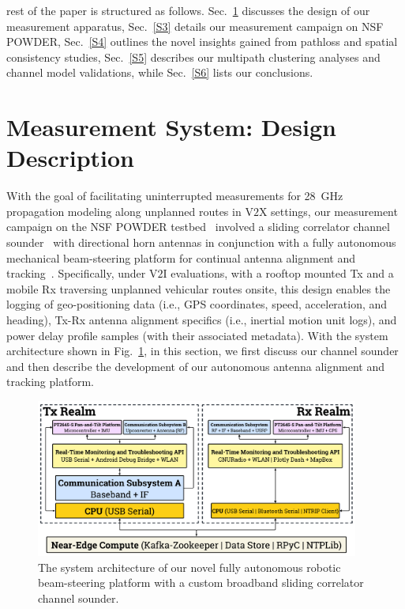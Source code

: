 \documentclass[10pt, twocolumn]{IEEEtran}
\begin{document}
 rest of the paper is structured as follows. Sec.~\ref{S2} discusses the design of our measurement apparatus, Sec.~\ref{S3} details our measurement campaign on NSF POWDER, Sec.~\ref{S4} outlines the novel insights gained from pathloss and spatial consistency studies, Sec.~\ref{S5} describes our multipath clustering analyses and channel model validations, while Sec.~\ref{S6} lists our conclusions.
\vspace{-8mm}

\section{Measurement System: Design Description}\label{S2}
With the goal of facilitating uninterrupted measurements for \SI{28}{\giga\hertz} propagation modeling along unplanned routes in V$2$X settings, our measurement campaign on the NSF POWDER testbed~\cite{POWDER} involved a sliding correlator channel sounder~\cite{Purdue} with directional horn antennas in conjunction with a fully autonomous mechanical beam-steering platform for continual antenna alignment and tracking~\cite{SPAVE_NRSM}. Specifically, under V$2$I evaluations, with a rooftop mounted Tx and a mobile Rx traversing unplanned vehicular routes onsite, this design enables the logging of geo-positioning data (i.e., GPS coordinates, speed, acceleration, and heading), Tx-Rx antenna alignment specifics (i.e., inertial motion unit logs), and power delay profile samples (with their associated metadata). With the system architecture shown in Fig.~\ref{F1}, in this section, we first discuss our channel sounder and then describe the development of our autonomous antenna alignment and tracking platform.
\begin{figure} [t]
    \centering
    \includegraphics[width=0.94875\textwidth]{figs/system_architecture.pdf}
    \vspace{-2.5mm}
    \caption{The system architecture of our novel fully autonomous robotic beam-steering platform with a custom broadband sliding correlator channel sounder.}
    \vspace{-6mm}
    \label{F1}
\end{figure}
\end{document}
